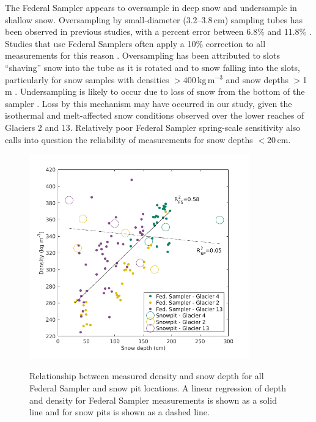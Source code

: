 \documentclass{sfuthesis}
\begin{document}
The Federal Sampler appears to oversample in deep snow and undersample in shallow snow. Oversampling by small-diameter (3.2--3.8\,cm) sampling tubes has been observed in previous studies, with a percent error between 6.8\% and 11.8\% \citep[e.g.][]{Work1965, Fames1982, Conger2009}. Studies that use Federal Samplers often apply a 10\% correction to all measurements for this reason \citep[e.g.][]{Molotch2005}. Oversampling has been attributed to slots ``shaving'' snow into the tube as it is rotated \citep[e.g.][]{Dixon2012} and to snow falling into the slots, particularly for snow samples with densities $>$400\,kg\,m$^{-3}$ and snow depths $>$1\,m \citep[e.g.][]{Beaumont1963}. Undersampling is likely to occur due to loss of snow from the bottom of the sampler \citep{Turcan1975}. Loss by this mechanism may have occurred in our study, given the isothermal and melt-affected snow conditions observed over the lower reaches of Glaciers 2 and 13. Relatively poor Federal Sampler spring-scale sensitivity also calls into question the reliability of measurements for snow depths $<$20\,cm.



\begin{figure}[p]
	\centering
	\includegraphics[width =0.85\textwidth]{DepthDensity_SWEonly.png}\\
	\caption{Relationship between measured density and snow depth for all Federal Sampler and snow pit locations. A linear regression of depth and density for Federal Sampler measurements is shown as a solid line and for snow pits is shown as a dashed line.}
	\label{fig:all_depth}
\end{figure}
\end{document}
